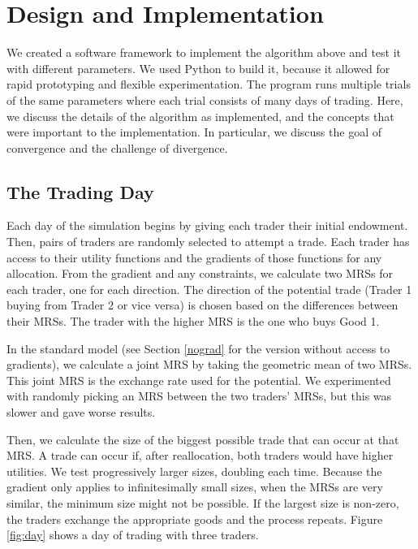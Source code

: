 \documentclass[12pt,a4paper,titlepage]{article}
\begin{document}


\section{Design and Implementation}\label{desimp}
We created a software framework to implement the algorithm above and test it with different parameters.
We used Python to build it, because it allowed for rapid prototyping and flexible experimentation.
The program runs multiple trials of the same parameters where each trial consists of many days of trading.
Here, we discuss the details of the algorithm as implemented, and the concepts that were important to the implementation.
In particular, we discuss the goal of convergence and the challenge of divergence.

\subsection{The Trading Day}

Each day of the simulation begins by giving each trader their initial endowment.
Then, pairs of traders are randomly selected to attempt a trade.
Each trader has access to their utility functions and the gradients of those functions for any allocation.
From the gradient and any constraints, we calculate two MRSs for each trader, one for each direction.
The direction of the potential trade (Trader 1 buying from Trader 2 or vice versa) is chosen based on the differences between their MRSs.
The trader with the higher MRS is the one who buys Good 1.

In the standard model (see Section \ref{nograd} for the version without access to gradients), we calculate a joint MRS by taking the geometric mean of two MRSs.
This joint MRS is the exchange rate used for the potential.
We experimented with randomly picking an MRS between the two traders' MRSs, but this was slower and gave worse results.


Then, we calculate the size of the biggest possible trade that can occur at that MRS.
A trade can occur if, after reallocation, both traders would have higher utilities.
We test progressively larger sizes, doubling each time.
Because the gradient only applies to infinitesimally small sizes, when the MRSs are very similar, the minimum size might not be possible.
If the largest size is non-zero, the traders exchange the appropriate goods and the process repeats.
Figure \ref{fig:day} shows a day of trading with three traders.
\end{document}
